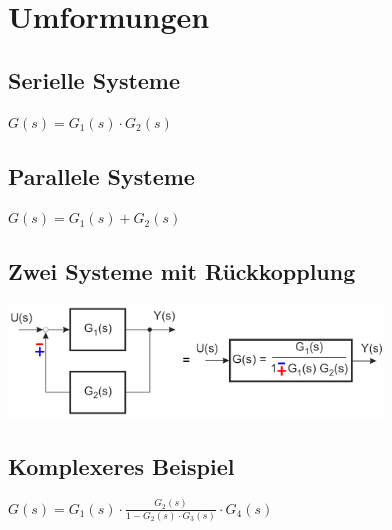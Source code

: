 \section{Umformungen}
	\subsection{Serielle Systeme}
		
		$G(s) = G_1(s) \cdot G_2(s)$
	\subsection{Parallele Systeme}
		
		$G(s) = G_1(s) + G_2(s)$
	\subsection{Zwei Systeme mit Rückkopplung}
		\includegraphics[height=3cm]{./images/feedback.png}
	\subsection{Komplexeres Beispiel}
		
		$G(s) = G_1(s) \cdot \frac{G_2(s)}{1-G_2(s) \cdot G_3(s)} \cdot G_4(s)$
